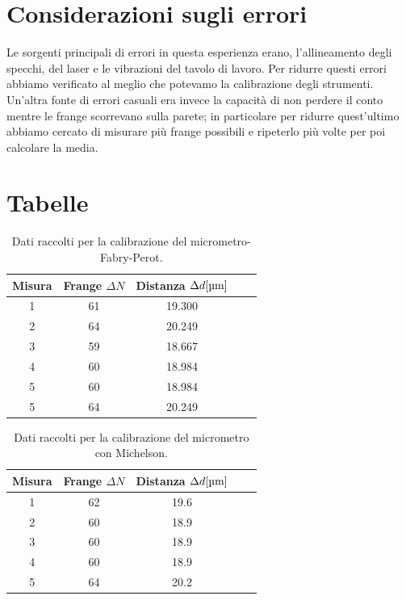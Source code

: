 \documentclass[letterpaper,12pt]{article}
\begin{document}
\section{Considerazioni sugli errori}
\label{sec:errori}
Le sorgenti principali di errori in questa esperienza erano, l'allineamento degli specchi, del laser
e le vibrazioni del tavolo di lavoro. Per ridurre questi errori abbiamo verificato al meglio che potevamo la calibrazione degli strumenti. 
Un'altra fonte di errori casuali era invece la capacità di non perdere il conto mentre le frange scorrevano sulla parete; in particolare per ridurre quest'ultimo 
abbiamo cercato di misurare più frange possibili e ripeterlo più volte per poi calcolare la media.


\section{Tabelle}

\begin{table}[h!]
    \centering
    \begin{tabular}{|c|c|c|c|c|}
    \hline
    \textbf{Misura} & \textbf{Frange $\Delta N$} & \textbf{Distanza $\Delta d[\text{\SIUnitSymbolMicro m}]$}  \\
    \hline
    1 & 61 & 19.300 \\
    2 & 64 & 20.249 \\
    3 & 59 & 18.667 \\
    4 & 60 & 18.984 \\
    5 & 60 & 18.984 \\
    5 & 64 & 20.249 \\
    \hline
    \end{tabular}
    \caption{Dati raccolti per la calibrazione del micrometro-Fabry-Perot.}
    \label{tab:calibrazione_micrometro}
\end{table}

\begin{table}[h!]
    \centering
    \begin{tabular}{|c|c|c|c|c|}
    \hline
    \textbf{Misura} & \textbf{Frange $\Delta N$} & \textbf{Distanza $\Delta d [\text{\SIUnitSymbolMicro m}]$}  \\
    \hline
    1 & 62 & 19.6 \\
    2 & 60 & 18.9 \\
    3 & 60 & 18.9 \\
    4 & 60 & 18.9 \\
    5 & 64 & 20.2 \\
    \hline
    \end{tabular}
    \caption{Dati raccolti per la calibrazione del micrometro con Michelson.}
    \label{tab:calibrazione_micrometro_michelson}
\end{table}
\end{document}
